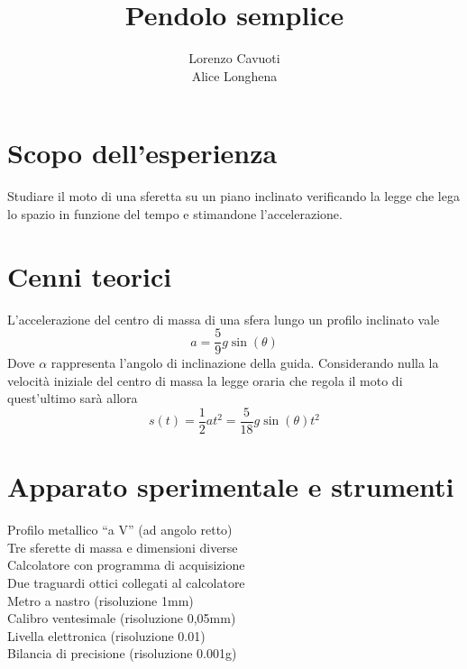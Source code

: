 \documentclass{article}
\title{Pendolo semplice}
\author{Lorenzo Cavuoti \\ Alice Longhena}
\begin{document}
	\maketitle
	
	\section{Scopo dell'esperienza}
		Studiare il moto di una sferetta su un piano inclinato verificando la legge che lega lo spazio in funzione del tempo e stimandone l’accelerazione.
	
	\section{Cenni teorici}
		L'accelerazione del centro di massa di una sfera lungo un profilo inclinato vale
		\begin{equation}
			a = \frac{5}{9}g\sin(\theta)
			\label{accelerazione}
		\end{equation}
		Dove $\alpha$ rappresenta l'angolo di inclinazione della guida. Considerando nulla la velocit\`{a} iniziale del centro di massa la legge oraria che regola il moto di quest'ultimo sar\`{a} allora
		\begin{equation}
			s(t) = \frac{1}{2}at^2 = \frac{5}{18}g\sin(\theta)t^2
			\label{legge oraria}
		\end{equation}
		
	\section{Apparato sperimentale e strumenti}
		Profilo metallico “a V” (ad angolo retto)\\
		Tre sferette di massa e dimensioni diverse\\
		Calcolatore con programma di acquisizione\\
		Due traguardi ottici collegati al calcolatore\\
		Metro a nastro (risoluzione 1mm)\\
		Calibro ventesimale (risoluzione 0,05mm)\\
		Livella elettronica (risoluzione 0.01\textdegree)\\
		Bilancia di precisione (risoluzione 0.001g)\\
	
\end{document}
